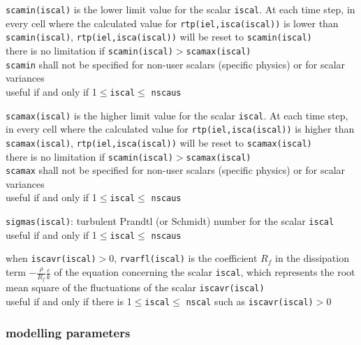 {{\tt scamin(iscal)} is the lower limit value for the scalar {\tt iscal}. At each time step,
in every cell where the calculated value for {\tt rtp(iel,isca(iscal))} is lower than
\mbox{\tt scamin(iscal)}, {\tt rtp(iel,isca(iscal))} will be reset to
\mbox{\tt scamin(iscal)}\\
there is no limitation if {\tt scamin(iscal)}$>${\tt scamax(iscal)}\\
{\tt scamin} shall not be specified for non-user scalars (specific physics) or for
scalar variances\\
useful if and only if 1$\leqslant${\tt iscal}$\leqslant$ {\tt nscaus}}

{{\tt scamax(iscal)} is the higher limit value for the scalar {\tt iscal}. At each time step,
in every cell where the calculated value for {\tt rtp(iel,isca(iscal))} is higher than
\mbox{\tt scamax(iscal)}, {\tt rtp(iel,isca(iscal))} will be reset to
\mbox{\tt scamax(iscal)}\\
there is no limitation if {\tt scamin(iscal)}$>${\tt scamax(iscal)}\\
{\tt scamax} shall not be specified for non-user scalars (specific physics)
 or for scalar variances\\
useful if and only if 1$\leqslant${\tt iscal}$\leqslant$ {\tt nscaus}}

{{\tt sigmas(iscal)}: turbulent Prandtl (or Schmidt) number for the scalar
 {\tt iscal}\\
useful if and only if  1$\leqslant${\tt iscal}$\leqslant$ {\tt nscaus}}

{when {\tt iscavr(iscal)}$>$0, {\tt rvarfl(iscal)} is the coefficient $R_f$ in
the dissipation term $\displaystyle -\frac{\rho}{R_f}\frac{\varepsilon}{k}$
of the equation concerning the scalar {\tt iscal},
which represents the root mean square of the
fluctuations of the scalar {\tt iscavr(iscal)}\\
useful if and only if there is 1$\leqslant${\tt iscal}$\leqslant$ {\tt nscal} such as
 {\tt iscavr(iscal)}$>$0}


\subsubsection{modelling parameters}

